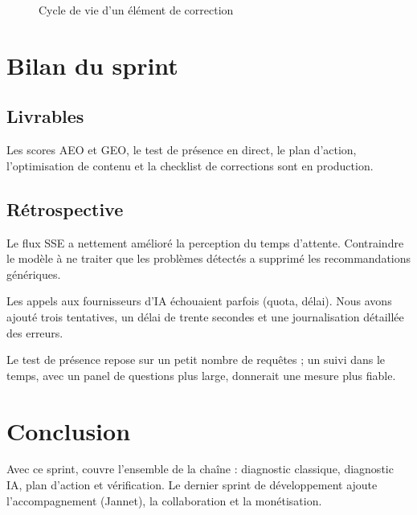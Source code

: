 \begin{figure}[htbp]
\centering
{}
\caption{Cycle de vie d'un élément de correction}\label{fig-cycle-correction}
\end{figure}


\section{Bilan du sprint}
\subsection{Livrables}
Les scores AEO et GEO, le test de présence en direct, le plan d'action, l'optimisation de contenu et la checklist de corrections sont en production.

\subsection{Rétrospective}
\begin{description}[leftmargin=1.2em,style=nextline]
  \item[Ce qui a bien fonctionné.] Le flux SSE a nettement amélioré la perception du temps d'attente. Contraindre le modèle à ne traiter que les problèmes détectés a supprimé les recommandations génériques.
  \item[Ce qui a posé problème.] Les appels aux fournisseurs d'IA échouaient parfois (quota, délai). Nous avons ajouté trois tentatives, un délai de trente secondes et une journalisation détaillée des erreurs.
  \item[À améliorer.] Le test de présence repose sur un petit nombre de requêtes ; un suivi dans le temps, avec un panel de questions plus large, donnerait une mesure plus fiable.
\end{description}

\section{Conclusion}
Avec ce sprint, \xapp{} couvre l'ensemble de la chaîne : diagnostic classique, diagnostic IA, plan d'action et vérification. Le dernier sprint de développement ajoute l'accompagnement (Jannet), la collaboration et la monétisation.
